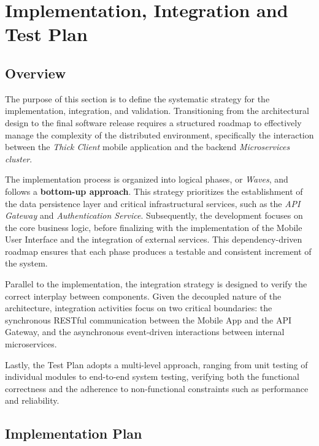 \chapter{Implementation, Integration and Test Plan}
\section{Overview}
The purpose of this section is to define the systematic strategy for the implementation, integration, and validation. Transitioning from the architectural design to the final software release requires a structured roadmap to effectively manage the complexity of the distributed environment, specifically the interaction between the \emph{Thick Client} mobile application and the backend \emph{Microservices cluster}.

The implementation process is organized into logical phases, or \emph{Waves}, and follows a \textbf{bottom-up approach}. This strategy prioritizes the establishment of the data persistence layer and critical infrastructural services, such as the \emph{API Gateway} and \emph{Authentication Service}. Subsequently, the development focuses on the core business logic, before finalizing with the implementation of the Mobile User Interface and the integration of external services. This dependency-driven roadmap ensures that each phase produces a testable and consistent increment of the system.

Parallel to the implementation, the integration strategy is designed to verify the correct interplay between components. Given the decoupled nature of the architecture, integration activities focus on two critical boundaries: the synchronous RESTful communication between the Mobile App and the API Gateway, and the asynchronous event-driven interactions between internal microservices.

Lastly, the Test Plan adopts a multi-level approach, ranging from unit testing of individual modules to end-to-end system testing, verifying both the functional correctness and the adherence to non-functional constraints such as performance and reliability.


\section{Implementation Plan}

